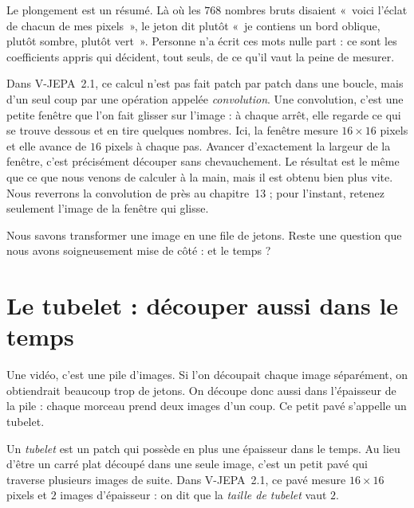 \begin{intuition}
Le plongement est un résumé. Là où les $768$ nombres bruts disaient «~voici
l'éclat de chacun de mes pixels~», le jeton dit plutôt «~je contiens un bord
oblique, plutôt sombre, plutôt vert~». Personne n'a écrit ces mots nulle
part : ce sont les coefficients appris qui décident, tout seuls, de ce
qu'il vaut la peine de mesurer.
\end{intuition}

\begin{surlesdonnees}
Dans V-JEPA~2.1, ce calcul n'est pas fait patch par patch dans une boucle,
mais d'un seul coup par une opération appelée \emph{convolution}. Une
convolution, c'est une petite fenêtre que l'on fait glisser sur l'image :
à chaque arrêt, elle regarde ce qui se trouve dessous et en tire quelques
nombres. Ici, la fenêtre mesure $16 \times 16$ pixels et elle avance de $16$
pixels à chaque pas. Avancer d'exactement la largeur de la fenêtre, c'est
précisément découper sans chevauchement. Le résultat est le même que ce que
nous venons de calculer à la main, mais il est obtenu bien plus vite. Nous
reverrons la convolution de près au chapitre~13 ; pour l'instant, retenez
seulement l'image de la fenêtre qui glisse.
\end{surlesdonnees}

Nous savons transformer une image en une file de jetons. Reste une question
que nous avons soigneusement mise de côté : et le temps ?

\section{Le tubelet : découper aussi dans le temps}

\begin{enclair}
Une vidéo, c'est une pile d'images. Si l'on découpait chaque image
séparément, on obtiendrait beaucoup trop de jetons. On découpe donc aussi
dans l'épaisseur de la pile : chaque morceau prend deux images d'un coup.
Ce petit pavé s'appelle un tubelet.
\end{enclair}

\begin{definition}[Le tubelet][tubelet]
Un \emph{tubelet} est un patch qui possède en plus une épaisseur dans le
temps. Au lieu d'être un carré plat découpé dans une seule image, c'est un
petit pavé qui traverse plusieurs images de suite. Dans V-JEPA~2.1, ce pavé
mesure $16 \times 16$ pixels et $2$ images d'épaisseur : on dit que la
\emph{taille de tubelet} vaut $2$.
\end{definition}

